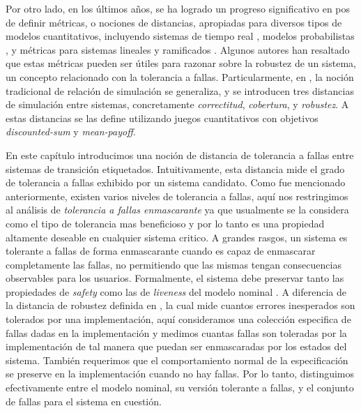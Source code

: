 Por otro lado, en los últimos años, se ha logrado un progreso significativo en pos de definir métricas, o nociones de distancias, apropiadas para diversos tipos de modelos cuantitativos, incluyendo sistemas de tiempo real \cite{HenzingerMP05}, modelos probabilistas \cite{DesharnaisGJP04}, y métricas para sistemas lineales y ramificados \cite{CernyHR12,AlfaroFS09,Henzinger13,LarsenFT11,ThraneFL10}. 
Algunos autores han resaltado que estas métricas pueden ser útiles para razonar sobre la robustez de un sistema, un concepto relacionado con la tolerancia a fallas. Particularmente, en \cite{CernyHR12}, la noción tradicional de relación de simulación se generaliza, y se introducen tres distancias de simulación entre sistemas, concretamente \emph{correctitud}, \emph{cobertura}, y \emph{robustez}.
A estas distancias se las define utilizando juegos cuantitativos con objetivos \emph{discounted-sum} y \emph{mean-payoff}.

En este capítulo introducimos una noción de distancia de tolerancia a fallas entre sistemas de transición etiquetados. Intuitivamente, esta distancia mide el grado de tolerancia a fallas exhibido por un sistema candidato. Como fue mencionado anteriormente, existen varios niveles de tolerancia a fallas, aquí nos restringimos al análisis de \emph{tolerancia a fallas enmascarante} ya que usualmente se la considera como el tipo de tolerancia mas beneficioso y por lo tanto es una propiedad altamente deseable en cualquier sistema critico.
A grandes rasgos, un sistema es tolerante a fallas de forma enmascarante cuando es capaz de enmascarar completamente las fallas, no permitiendo que las mismas tengan consecuencias observables para los usuarios. Formalmente, el sistema debe preservar tanto las propiedades de \textit{safety} como las de \textit{liveness} del modelo nominal \cite{Gartner99}. A diferencia de la distancia de robustez definida en \cite{CernyHR12}, la cual mide cuantos errores inesperados son tolerados por una implementación, aquí consideramos una colección especifica de fallas dadas en la implementación y medimos cuantas fallas son toleradas por la implementación de tal manera que puedan ser enmascaradas por los estados del sistema.
También requerimos que el comportamiento normal de la especificación se preserve en la implementación cuando no hay fallas.
Por lo tanto, distinguimos efectivamente entre el modelo nominal, su versión tolerante a fallas,  y el conjunto de fallas para el sistema en cuestión.

